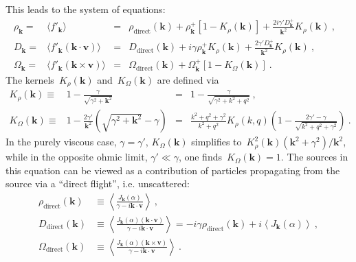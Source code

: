 \documentclass[preprint,aps,eqsecnum]{revtex4-1}
\newcommand{\fplus}[1]{{#1}^{+}}
\newcommand{\dct}[1]{{#1}_\mathrm{direct}}
\begin{document}
This leads to the system of equations:
\begin{align}
  \rho_{\bm k} ={}& \langle f'_{\bm k} \rangle
     &={}&\dct{\rho}({\bm k})
  + \fplus{\rho}_{\bm k} \left[1 - K_\rho({\bm k})\right] + \frac{2 i \gamma'
    \fplus{D}_{\bm k}}{{\bm k}^2} K_\rho({\bm k})
  \ ,&
  \label{eq:wh-rho}
  \\
  D_{\bm k} ={}& \langle f'_{\bm k} ({\bm k} \cdot {\bm v}) \rangle
  &={}&\dct{D}({\bm k}) + i \gamma \fplus{\rho}_{\bm k} K_\rho({\bm k})
  + \frac{2\gamma' \fplus{D}_{\bm k}}{{\bm k}^2} K_\rho({\bm k})\ ,&
  \label{eq:wh-D}
  \\
  \Omega_{\bm k} ={}&  \langle f'_{\bm k} ({\bm k} \times {\bm v}) \rangle
  &={}&  \dct{\Omega} ({\bm k})
  + \fplus{\Omega}_{\bm k} \left[1 - K_\Omega({\bm k})\right]
  \ .&
  \label{eq:wh-Omega}
\end{align}
The kernels~$K_\rho({\bm k})$ and~$K_\Omega({\bm k})$ are defined via
\begin{align}
  \label{eq:K-rho-def}
   K_\rho({\bm k}) \equiv{}& 1 - \frac{\gamma}{\sqrt{\gamma^2 + {\bm k}^2}}
   &={}& 1 - \frac{\gamma}{\sqrt{\gamma^2 + k^2 + q^2}}\ ,
\\
\label{eq:K-omega-def}
  K_\Omega({\bm k}) \equiv{}&
  1 - \frac{2\gamma'}{{\bm k}^2}\left(\sqrt{\gamma^2 + {\bm k}^2} - \gamma\right)
  &={}& \frac{k^2 + q^2 + \gamma^2}{k^2 + q^2} K_\rho(k, q)
  \left(1 - \frac{2\gamma' - \gamma}{\sqrt{k^2 + q^2 + \gamma^2}}\right)
  \ .
\end{align}
In the purely viscous case, $\gamma = \gamma'$,
$K_\Omega({\bm k})$ simplifies
to~$K_\rho^2({\bm k}) ({\bm k}^2 + \gamma^2)/{\bm k}^2$, while
in the opposite ohmic limit, $\gamma' \ll \gamma$, one
finds~$K_\Omega({\bm k}) = 1$.
The sources in this equation can be viewed as a contribution of particles
propagating from the source via a ``direct flight'', i.e. unscattered:
\begin{align}
\label{eq:rho-direct}
  \dct{\rho}({\bm k}) &\equiv
  \left\langle
      \frac{J_{\bm k}(\alpha)}{ \gamma - i {\bm k} \cdot {\bm v}}
  \right\rangle
  \ ,
  \\
  \label{eq:D-direct}
  \dct{D}({\bm k}) &\equiv
  \left\langle
       \frac{J_{\bm k}(\alpha) ({\bm k} \cdot {\bm v})}{\gamma
                                             - i {\bm k} \cdot {\bm v}}
  \right\rangle
  = -i \gamma \dct{\rho}({\bm k})
  + i \left\langle J_{\bm k}(\alpha) \right\rangle
  \ ,
  \\
  \label{eq:omega-direct}
  \dct{\Omega}({\bm k}) &\equiv
  \left\langle
       \frac{J_{\bm k}(\alpha) ({\bm k} \times {\bm v})}{\gamma
                                            - i {\bm k} \cdot {\bm v}}
   \right\rangle
  \ .
\end{align}
\end{document}
